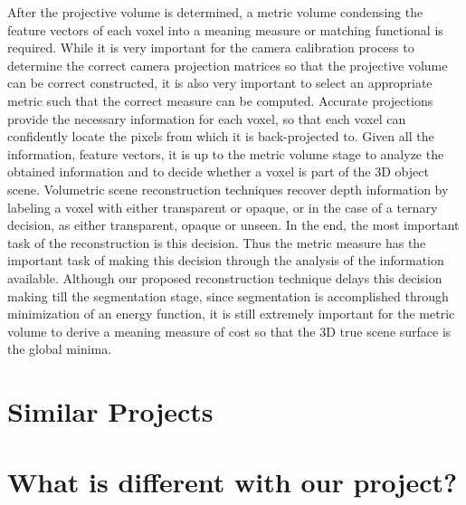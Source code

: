 \begin{enumerate}
   After the projective volume is determined, a metric volume condensing the feature vectors of each voxel into a meaning measure or matching functional is required. While it is very important for the camera calibration process to determine the correct camera projection matrices so that the projective volume can be correct constructed, it is also very important to select an appropriate metric such that the correct measure can be computed. Accurate projections provide the necessary information for each voxel, so that each voxel can confidently locate the pixels from which it is back-projected to. Given all the information, feature vectors, it is up to the metric volume stage to analyze the obtained information and to decide whether a voxel is part of the 3D object scene. Volumetric scene reconstruction techniques recover depth information by labeling a voxel with either transparent or opaque, or in the case of a ternary decision, as either transparent, opaque or unseen. In the end, the most important task of the reconstruction is this decision. Thus the metric measure has the important task of making this decision through the analysis of the information available. Although our proposed reconstruction technique delays this decision making till the segmentation stage, since segmentation is accomplished through minimization of an energy function, it is still extremely important for the metric volume to derive a meaning measure of cost so that the 3D true scene surface is the global minima.
	
\end{enumerate}



\section{Similar Projects}
\section{What is different with our project?}
